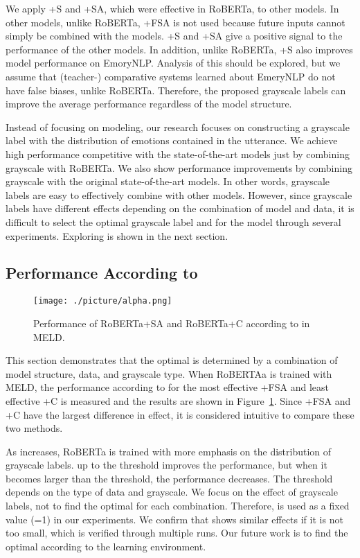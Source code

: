 \documentclass[a4paper]{article}
\begin{document}
We apply +S and +SA, which were effective in RoBERTa, to other models. In other models, unlike RoBERTa, +FSA is not used because future inputs cannot simply be combined with the models. +S and +SA give a positive signal to the performance of the other models. In addition, unlike RoBERTa, +S also improves model performance on EmoryNLP. Analysis of this should be explored, but we assume that (teacher-) comparative systems learned about EmeryNLP do not have false biases, unlike RoBERTa. Therefore, the proposed grayscale labels can improve the average performance regardless of the model structure.


Instead of focusing on modeling, our research focuses on constructing a grayscale label with the distribution of emotions contained in the utterance. We achieve high performance competitive with the state-of-the-art models just by combining grayscale with RoBERTa. We also show performance improvements by combining grayscale with the original state-of-the-art models. In other words, grayscale labels are easy to effectively combine with other models. However, since grayscale labels have different effects depending on the combination of model and data, it is difficult to select the optimal grayscale label and  for the model through several experiments. Exploring  is shown in the next section.




\subsection{Performance According to }
\label{sec:alpha}

\begin{figure}[!t]
    \centering 
    \texttt{[image: ./picture/alpha.png]}
    \caption{Performance of RoBERTa+SA and RoBERTa+C according to  in MELD.}
    \label{fig:alpha}
\end{figure}



This section demonstrates that the optimal  is determined by a combination of model structure, data, and grayscale type. When RoBERTAa is trained with MELD, the performance according to  for the most effective +FSA and least effective +C is measured and the results are shown in Figure~\ref{fig:alpha}. Since +FSA and +C have the largest difference in effect, it is considered intuitive to compare these two methods.

As  increases, RoBERTa is trained with more emphasis on the distribution of grayscale labels.  up to the threshold improves the performance, but when it becomes larger than the threshold, the performance decreases. The threshold depends on the type of data and grayscale. We focus on the effect of grayscale labels, not to find the optimal  for each combination. Therefore,  is used as a fixed value (=1) in our experiments. We confirm that  shows similar effects if it is not too small, which is verified through multiple runs. Our future work is to find the optimal  according to the learning environment.
\end{document}
